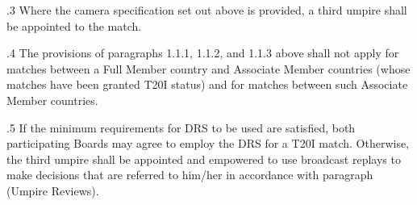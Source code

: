 \documentclass[12pt]{article}
\begin{document}
\vspace{\baselineskip}

\vspace{\baselineskip}

\vspace{\baselineskip}

\vspace{\baselineskip}

\vspace{\baselineskip}

\vspace{\baselineskip}

\vspace{\baselineskip}

\vspace{\baselineskip}

\vspace{\baselineskip}

\vspace{\baselineskip}

\vspace{\baselineskip}

\vspace{\baselineskip}

\vspace{\baselineskip}

\vspace{\baselineskip}
{\fontsize{9pt}{10.8pt}.3 \tabto{0.49in} Where the camera specification set out above is provided, a third umpire shall be appointed to the match.\par}\par


\vspace{\baselineskip}
\begin{adjustwidth}{0.5in}{0.18in}
{\fontsize{9pt}{10.8pt}.4 \tabto{0.49in} The provisions of paragraphs 1.1.1, 1.1.2, and 1.1.3 above shall not apply for matches between a Full Member country and Associate Member countries (whose matches have been granted T20I status) and for matches between such Associate Member countries.\par}\par

\end{adjustwidth}


\vspace{\baselineskip}
\begin{adjustwidth}{0.5in}{0.28in}
{\fontsize{9pt}{10.8pt}.5 \tabto{0.49in} If the minimum requirements for DRS to be used are satisfied, both participating Boards may agree to employ the DRS for a T20I match. Otherwise, the third umpire shall be appointed and empowered to use broadcast replays to make decisions that are referred to him/her in accordance with paragraph (Umpire Reviews).\par}\par

\end{adjustwidth}
\end{document}
